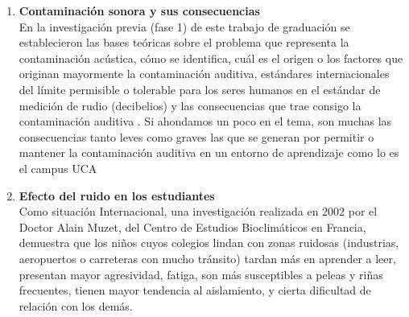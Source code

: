 {{\begin{enumerate}[label=\textbf{1.\arabic*}]
 El ruido es considerado un peligro para la salud humana y sus efectos son catalogados como un problema sanitario cada vez más agravante. Puede causar desde insomnio, ansiedad, depresión, estrés, entre otros efectos psicológicos, hasta la pérdida parcial o total de la audición. Un ambiente que sobrepase los 55 decibelios (dB) es considerado un ambiente ruidoso, de 75 a 100dB es considerado un ambiente con ruido fuerte y superior a los 100dB es considerado un ambiente con ruido intolerable.$^[^3^]$ \\

\item \textbf{Contaminación sonora y sus consecuencias} \\

En la investigación previa (fase 1) de este trabajo de graduación se establecieron las bases teóricas sobre el problema que representa la contaminación acústica, cómo se identifica, cuál es el origen o los factores que originan mayormente la contaminación auditiva, estándares internacionales del límite permisible o tolerable para los seres humanos en el estándar de medición de rudio (decibelios) y las consecuencias que trae consigo la contaminación auditiva \parencite{carpio2025}. 
Si ahondamos un poco en el tema, son muchas las consecuencias tanto leves como graves las que se generan por permitir o mantener la contaminación auditiva en un entorno de aprendizaje como lo es el campus UCA   \\

\item \textbf{Efecto del ruido en los estudiantes} \\

Como situación Internacional, una investigación realizada en
2002 por el Doctor Alain Muzet, del Centro de Estudios
Bioclimáticos en Francia, demuestra que los niños cuyos
colegios lindan con zonas ruidosas (industrias, aeropuertos o
carreteras con mucho tránsito) tardan más en aprender a leer,
presentan mayor agresividad, fatiga, son más susceptibles a
peleas y riñas frecuentes, tienen mayor tendencia al
aislamiento, y cierta dificultad de relación con los demás.

        \end{enumerate}
            



}}
